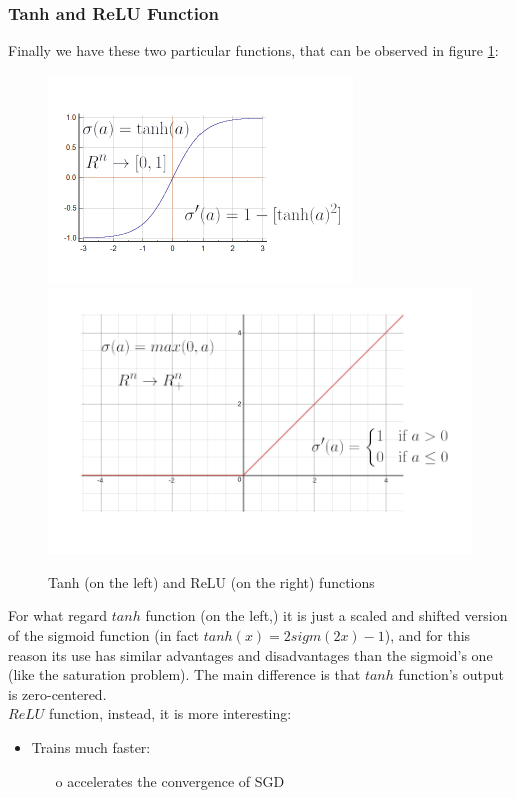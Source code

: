 \documentclass[12pt]{report}
\theoremstyle{plain}
\begin{document}
\begin{flushleft}
\subsubsection{Tanh and ReLU Function}
Finally we have these two particular functions, that can be observed in figure \ref{fig:NN_tanh_relu}:
\begin{figure}[!h]
	\centering
	\includegraphics[scale=1.6]{images/NN_tanh_act.pdf}
	\includegraphics[scale=1.1]{images/NN_ReLU_act.pdf}
	\caption{Tanh (on the left) and ReLU (on the right) functions}
	\label{fig:NN_tanh_relu}
\end{figure}
For what regard $tanh$ function (on the left,) it is just a scaled and shifted version of the sigmoid function (in fact $tanh(x)=2sigm(2x)-1$), and for this reason its use has similar advantages and disadvantages than the sigmoid's one (like the saturation problem). The main difference is that $tanh$ function's output is zero-centered.\\
$ReLU$ function, instead, it is more interesting: 
\begin{itemize}
	\item Trains much faster: 
	\begin{itemize}
		\item[o] accelerates the convergence of SGD

\end{itemize}
\end{itemize}
\end{flushleft}
\end{document}
